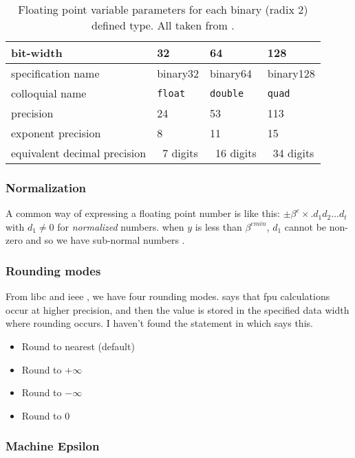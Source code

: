 \documentclass{article}
\begin{document}
\FloatBarrier
\begin{table}[t]
	\caption{Floating point variable parameters for each binary (radix 2) defined type. All taken from \cite{ieee-754-2008}.} \label{tab:float-par}
\begin{tabular}{llll}
\hline
bit-width & 32 & 64 & 128 \\
\hline
specification name & binary32 & binary64 & binary128 \\
\hline
colloquial name & \texttt{float} & \texttt{double} & \texttt{quad} \\
\hline
precision & 24 & 53 & 113 \\
\hline
exponent precision & 8 & 11 & 15 \\
\hline
equivalent decimal precision & ~7 digits & ~16 digits & ~34 digits \\
\hline
\end{tabular}
\end{table}
\FloatBarrier

\subsubsection{Normalization}

A common way of expressing a floating point number is like this: $\pm\beta^e\times. d_1 d_2 \ldots d_t$ with $d_1 \neq 0$ for \textit{normalized} numbers. when $y$ is less than $\beta^{emin}$, $d_1$ cannot be non-zero and so we have sub-normal numbers \cite{higham-numerical-accuracy-and-stability}.

\subsubsection{Rounding modes}

From libc and ieee \cite{gnu-libc-rounding,ieee-754-2008}, we have four rounding modes. \cite{gnu-libc-rounding} says that fpu calculations occur at higher precision, and then the value is stored in the specified data width where rounding occurs. I haven't found the statement in \cite{ieee-754-2008} which says this.

\begin{itemize}
\item Round to nearest (default)
\item Round to $+\infty$
\item Round to $-\infty$
\item Round to 0
\end{itemize}

\subsubsection{Machine Epsilon}
\end{document}

